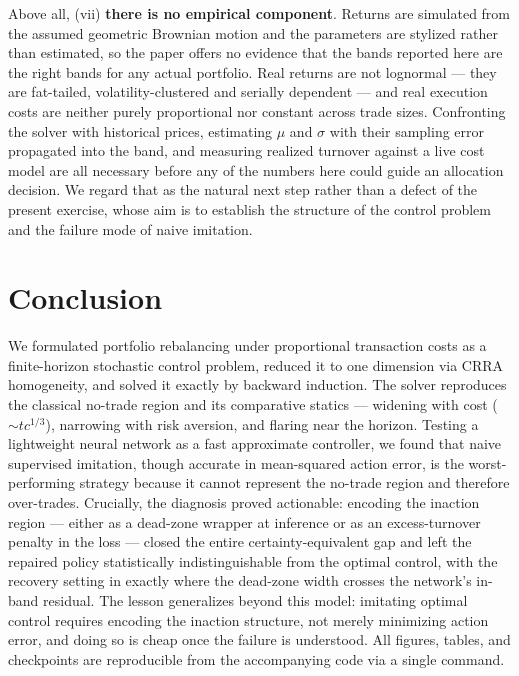 \documentclass[11pt]{article}
\begin{document}
Above all, (vii) \textbf{there is no empirical component}. Returns are simulated
from the assumed geometric Brownian motion and the parameters are stylized
rather than estimated, so the paper offers no evidence that the bands reported
here are the right bands for any actual portfolio. Real returns are not
lognormal --- they are fat-tailed, volatility-clustered and serially dependent
--- and real execution costs are neither purely proportional nor constant across
trade sizes. Confronting the solver with historical prices, estimating $\mu$ and
$\sigma$ with their sampling error propagated into the band, and measuring
realized turnover against a live cost model are all necessary before any of the
numbers here could guide an allocation decision. We regard that as the natural
next step rather than a defect of the present exercise, whose aim is to
establish the structure of the control problem and the failure mode of naive
imitation.

\section{Conclusion}

We formulated portfolio rebalancing under proportional transaction costs as a
finite-horizon stochastic control problem, reduced it to one dimension via CRRA
homogeneity, and solved it exactly by backward induction. The solver reproduces
the classical no-trade region and its comparative statics --- widening with cost
($\sim tc^{1/3}$), narrowing with risk aversion, and flaring near the horizon.
Testing a lightweight neural network as a fast approximate controller, we found
that naive supervised imitation, though accurate in mean-squared action error,
is the worst-performing strategy because it cannot represent the no-trade region
and therefore over-trades. Crucially, the diagnosis proved actionable: encoding
the inaction region --- either as a dead-zone wrapper at inference or as an
excess-turnover penalty in the loss --- closed the entire certainty-equivalent
gap and left the repaired policy statistically indistinguishable from the
optimal control, with the recovery setting in exactly where the dead-zone width
crosses the network's in-band residual. The lesson generalizes beyond this
model: imitating optimal control requires encoding the inaction structure, not
merely minimizing action error, and doing so is cheap once the failure is
understood. All figures, tables, and checkpoints are reproducible from the
accompanying code via a single command.
\end{document}
